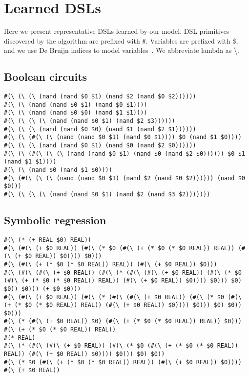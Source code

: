 \documentclass{article}
\begin{document}
\section{Learned DSLs}

Here we present representative DSLs learned by
our model. DSL primitives discovered by the algorithm are prefixed with
\lstinline!#!.
Variables are prefixed with \$, and we use De Bruijn indices to model variables~\cite{pierce}.
We abbreviate lambda as \textbackslash.

\pagebreak
\onecolumn
\subsection{Boolean circuits}

\begin{lstlisting}[breaklines=true]
#(\ (\ (\ (nand (nand $0 $1) (nand $2 (nand $0 $2))))))
#(\ (\ (nand (nand $0 $1) (nand $0 $1))))
#(\ (\ (nand (nand $0 $0) (nand $1 $1))))
#(\ (\ (\ (\ (nand (nand $0 $1) (nand $2 $3))))))
#(\ (\ (\ (nand (nand $0 $0) (nand $1 (nand $2 $1))))))
#(\ (\ (#(\ (\ (nand (nand $0 $1) (nand $0 $1)))) $0 (nand $1 $0))))
#(\ (\ (\ (nand (nand $0 $1) (nand $0 (nand $2 $0))))))
#(\ (\ (#(\ (\ (\ (nand (nand $0 $1) (nand $0 (nand $2 $0)))))) $0 $1 (nand $1 $1))))
#(\ (\ (nand $0 (nand $1 $0))))
#(\ (#(\ (\ (\ (nand (nand $0 $1) (nand $2 (nand $0 $2)))))) (nand $0 $0)))
#(\ (\ (\ (\ (nand (nand $0 $1) (nand $2 (nand $3 $2)))))))
\end{lstlisting}

\subsection{Symbolic regression}
\begin{lstlisting}[breaklines=true]
#(\ (* (+ REAL $0) REAL))
#(\ (#(\ (+ $0 REAL)) (#(\ (* $0 (#(\ (+ (* $0 (* $0 REAL)) REAL)) (#(\ (+ $0 REAL)) $0)))) $0)))
#(\ (#(\ (+ (* $0 (* $0 REAL)) REAL)) (#(\ (+ $0 REAL)) $0)))
#(\ (#(\ (#(\ (+ $0 REAL)) (#(\ (* (#(\ (#(\ (+ $0 REAL)) (#(\ (* $0 (#(\ (+ (* $0 (* $0 REAL)) REAL)) (#(\ (+ $0 REAL)) $0)))) $0))) $0) $0)) $0))) (+ $0 $0)))
#(\ (#(\ (+ $0 REAL)) (#(\ (* (#(\ (#(\ (+ $0 REAL)) (#(\ (* $0 (#(\ (+ (* $0 (* $0 REAL)) REAL)) (#(\ (+ $0 REAL)) $0)))) $0))) $0) $0)) $0)))
#(\ (* (#(\ (+ $0 REAL)) $0) (#(\ (+ (* $0 (* $0 REAL)) REAL)) $0)))
#(\ (+ (* $0 (* $0 REAL)) REAL))
#(* REAL)
#(\ (* (#(\ (#(\ (+ $0 REAL)) (#(\ (* $0 (#(\ (+ (* $0 (* $0 REAL)) REAL)) (#(\ (+ $0 REAL)) $0)))) $0))) $0) $0))
#(\ (* $0 (#(\ (+ (* $0 (* $0 REAL)) REAL)) (#(\ (+ $0 REAL)) $0))))
#(\ (+ $0 REAL))
\end{lstlisting}
\end{document}
